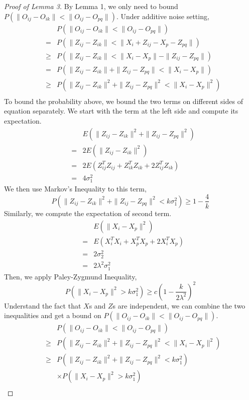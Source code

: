\documentclass{article}
\begin{document}
\begin{proof}[Proof of Lemma 3]
By Lemma 1, we only need to bound $P(\|O_{ij}-O_{ik}\| < \|O_{ij}-O_{pq}\|)$. Under additive noise setting,
\begin{eqnarray*}
& &P(\|O_{ij}-O_{ik}\| < \|O_{ij}-O_{pq}\|) \\
&=&P(\|Z_{ij}-Z_{ik}\| < \|X_{i}+Z_{ij}-X_{p}-Z_{pq}\|) \\
&\geq&P(\|Z_{ij}-Z_{ik}\| < \|X_{i}-X_{p}\| - \|Z_{ij}-Z_{pq}\|) \\
&=& P(\|Z_{ij}-Z_{ik}\|+\|Z_{ij}-Z_{pq}\|< \|X_{i}-X_{p}\|) \\
&\geq& P(\|Z_{ij}-Z_{ik}\|^2+\|Z_{ij}-Z_{pq}\|^2< \|X_{i}-X_{p}\|^2) \\
\end{eqnarray*}
To bound the probability above, we bound the two terms on different sides of equation separately. We start with the term at the left side and compute its expectation.
 \begin{eqnarray*}
 & &E(\|Z_{ij}-Z_{ik}\|^2+\|Z_{ij}-Z_{pq}\|^2) \\
 &=&2 E(\|Z_{ij}-Z_{ik}\|^2) \\
 &=&2 E(Z_{ij}^T Z_{ij}+Z_{ik}^T Z_{ik} +2Z_{ij}^T Z_{ik}) \\
 &=&4\sigma_1^2
 \end{eqnarray*}
 We then use Markov's Inequality to this term, 
 \[P(\|Z_{ij}-Z_{ik}\|^2+\|Z_{ij}-Z_{pq}\|^2 < k\sigma_1^2) \geq 1-\frac{4}{k} \]
 Similarly, we compute the expectation of second term.
  \begin{eqnarray*}
  & &E(\|X_{i}-X_{p}\|^2) \\
  &=&E(X_{i}^T X_{i}+X_{p}^T X_{p}+2X_{i}^T X_{p}) \\
  &=&2\sigma_2^2 \\
  &=&2\lambda^2\sigma_1^2
  \end{eqnarray*}
Then, we apply Paley-Zygmund Inequality,
\[P(\|X_i-X_p\|^2 > k\sigma_1^2 ) \geq c(1-\frac{k}{2\lambda^2})^2 \]
Understand the fact that $X$s and $Z$s are independent, we can combine the two inequalities and get a bound on $P(\|O_{ij}-O_{ik}\| < \|O_{ij}-O_{pq}\|)$.
\begin{eqnarray*}
& &P(\|O_{ij}-O_{ik}\| < \|O_{ij}-O_{pq}\|) \\
&\geq& P(\|Z_{ij}-Z_{ik}\|^2+\|Z_{ij}-Z_{pq}\|^2< \|X_{i}-X_{p}\|^2) \\
&\geq& P(\|Z_{ij}-Z_{ik}\|^2+\|Z_{ij}-Z_{pq}\|^2<k\sigma_1^2) \\
& & \times P(\|X_i-X_p\|^2 > k\sigma_1^2 ) \\

\end{eqnarray*}
\end{proof}
\end{document}
